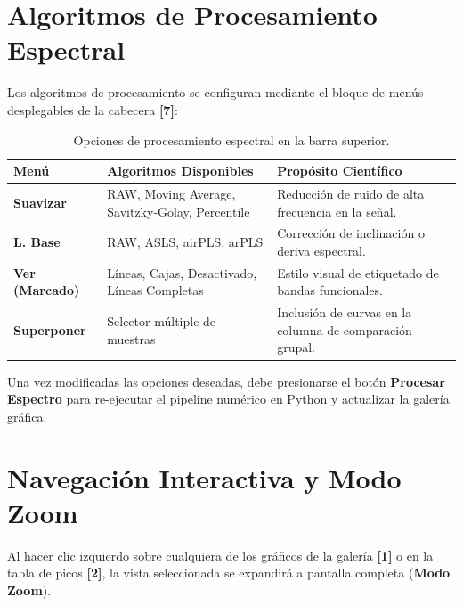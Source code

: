 \documentclass[11pt,a4paper]{article}
\begin{document}
\section{Algoritmos de Procesamiento Espectral}

Los algoritmos de procesamiento se configuran mediante el bloque de menús desplegables de la cabecera \textbf{[7]}:

\begin{table}[h!]
\centering
\begin{tabularx}{\textwidth}{@{}l l X@{}}
\toprule
\textbf{Menú} & \textbf{Algoritmos Disponibles} & \textbf{Propósito Científico} \\ \midrule
\textbf{Suavizar} & RAW, Moving Average, Savitzky-Golay, Percentile & Reducción de ruido de alta frecuencia en la señal. \\ \hline
\textbf{L. Base} & RAW, ASLS, airPLS, arPLS & Corrección de inclinación o deriva espectral. \\ \hline
\textbf{Ver (Marcado)} & Líneas, Cajas, Desactivado, Líneas Completas & Estilo visual de etiquetado de bandas funcionales. \\ \hline
\textbf{Superponer} & Selector múltiple de muestras & Inclusión de curvas en la columna de comparación grupal. \\ \bottomrule
\end{tabularx}
\caption{Opciones de procesamiento espectral en la barra superior.}
\end{table}

Una vez modificadas las opciones deseadas, debe presionarse el botón \textbf{\color{numred}Procesar Espectro} para re-ejecutar el pipeline numérico en Python y actualizar la galería gráfica.

\section{Navegación Interactiva y Modo Zoom}

Al hacer clic izquierdo sobre cualquiera de los gráficos de la galería \textbf{[1]} o en la tabla de picos \textbf{[2]}, la vista seleccionada se expandirá a pantalla completa (\textbf{Modo Zoom}).
\end{document}
